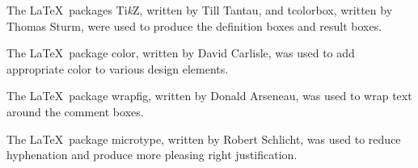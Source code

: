 \begin{Itemize}
\item
The \LaTeX\ packages \textsf{Ti\textit{k}Z}, written by Till Tantau, and \textsf{tcolorbox}, written by Thomas Sturm, were used to produce the definition boxes and result boxes.

\item
The \LaTeX\ package \textsf{color}, written by David Carlisle, was used to add appropriate color to various design elements.

\item
The \LaTeX\ package \textsf{wrapfig}, written by Donald Arseneau, was used to wrap text around the comment boxes.

\item
The \LaTeX\ package \textsf{microtype}, written by Robert Schlicht, was used to reduce hyphenation and produce more pleasing right justification.

\end{Itemize}

\endinput 
